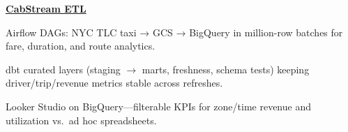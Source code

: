 \begin{twocolentry}{}
\href{https://github.com/faketut/CabStream-ETL}{\textbf{CabStream ETL}}
\end{twocolentry}
\begin{onecolentry}
\begin{highlights}
\item Airflow DAGs: NYC TLC taxi → GCS → BigQuery in million-row batches for fare, duration, and route analytics.
\item dbt curated layers (staging $\rightarrow$ marts, freshness, schema tests) keeping driver/trip/revenue metrics stable across refreshes.
\item Looker Studio on BigQuery—filterable KPIs for zone/time revenue and utilization vs.\ ad hoc spreadsheets.
\end{highlights}
\end{onecolentry}
